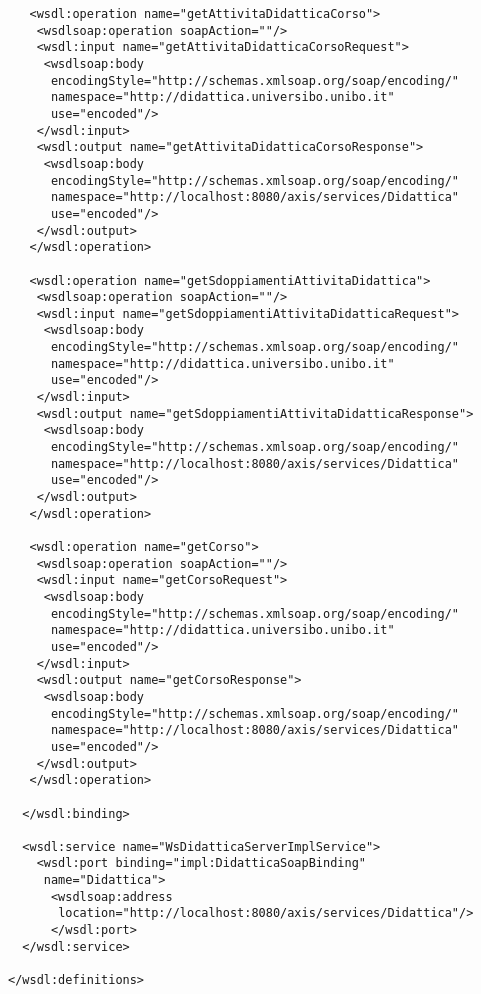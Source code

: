 \begin{small}
\begin{verbatim}
   <wsdl:operation name="getAttivitaDidatticaCorso">
    <wsdlsoap:operation soapAction=""/>
    <wsdl:input name="getAttivitaDidatticaCorsoRequest">
     <wsdlsoap:body
      encodingStyle="http://schemas.xmlsoap.org/soap/encoding/"
      namespace="http://didattica.universibo.unibo.it" 
      use="encoded"/>
    </wsdl:input>
    <wsdl:output name="getAttivitaDidatticaCorsoResponse">
     <wsdlsoap:body 
      encodingStyle="http://schemas.xmlsoap.org/soap/encoding/"
      namespace="http://localhost:8080/axis/services/Didattica"
      use="encoded"/>
    </wsdl:output>
   </wsdl:operation>

   <wsdl:operation name="getSdoppiamentiAttivitaDidattica">
    <wsdlsoap:operation soapAction=""/>
    <wsdl:input name="getSdoppiamentiAttivitaDidatticaRequest">
     <wsdlsoap:body
      encodingStyle="http://schemas.xmlsoap.org/soap/encoding/"
      namespace="http://didattica.universibo.unibo.it" 
      use="encoded"/>
    </wsdl:input>
    <wsdl:output name="getSdoppiamentiAttivitaDidatticaResponse">
     <wsdlsoap:body 
      encodingStyle="http://schemas.xmlsoap.org/soap/encoding/"
      namespace="http://localhost:8080/axis/services/Didattica"
      use="encoded"/>
    </wsdl:output>
   </wsdl:operation>

   <wsdl:operation name="getCorso">
    <wsdlsoap:operation soapAction=""/>
    <wsdl:input name="getCorsoRequest">
     <wsdlsoap:body
      encodingStyle="http://schemas.xmlsoap.org/soap/encoding/"
      namespace="http://didattica.universibo.unibo.it" 
      use="encoded"/>
    </wsdl:input>
    <wsdl:output name="getCorsoResponse">
     <wsdlsoap:body 
      encodingStyle="http://schemas.xmlsoap.org/soap/encoding/"
      namespace="http://localhost:8080/axis/services/Didattica"
      use="encoded"/>
    </wsdl:output>
   </wsdl:operation>

  </wsdl:binding>

  <wsdl:service name="WsDidatticaServerImplService">
    <wsdl:port binding="impl:DidatticaSoapBinding" 
     name="Didattica">
      <wsdlsoap:address
       location="http://localhost:8080/axis/services/Didattica"/>
      </wsdl:port>
  </wsdl:service>

</wsdl:definitions>
\end{verbatim}\end{small}
